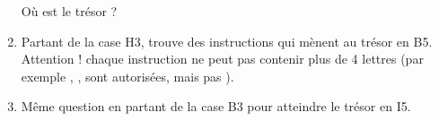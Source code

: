 \documentclass[class=report,crop=false, 12pt]{standalone}
\begin{document}
\begin{activite}
\begin{enumerate}
Où est le trésor ?
  
  
  
  \item Partant de la case H3, trouve des instructions qui mènent au trésor en B5. Attention ! chaque instruction ne peut pas contenir plus de 4 lettres (par exemple , ,  sont autorisées, mais pas ).
  
  \item Même question en partant de la case B3 pour atteindre le trésor en I5.
  
\end{enumerate}


\end{activite}
\end{document}
